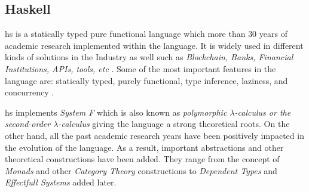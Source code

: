 \documentclass[preprint]{elsarticle}
\begin{document}




%

\subsection{Haskell}
\acrshort{hs} is a statically typed pure functional language which more than $30$ years of academic research implemented within the language. It is widely used in different kinds of solutions in the Industry as well such as \emph{Blockchain, Banks, Financial Institutions, APIs, tools, etc} \cite{hsindustry}. Some of the most important features in the language are: statically typed, purely functional, type inference, laziness, and concurrency \cite{haskell}.

\acrshort{hs} implements \emph{System F} \cite{systemf} which is also known as \textit{polymorphic $\lambda$-calculus or the second-order $\lambda$-calculus} giving the language a strong theoretical roots. On the other hand, all the past academic research years have been positively impacted in the evolution of the language. As a result, important abstractions and other theoretical constructions have been added. They range from the concept of \textit{Monads} \cite{monads} and other \textit{Category Theory} \cite{arrows} constructions to \textit{Dependent Types} \cite{dependenttypes} and \textit{Effectfull Systems} \cite{extensibleeff} added later. 
\end{document}

